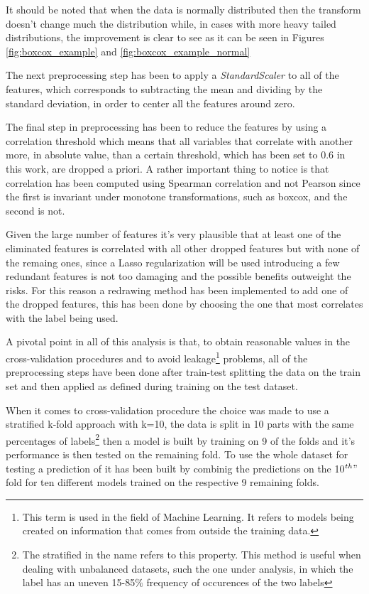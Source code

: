 It should be noted that when the data is normally distributed then the transform doesn't change much the distribution while, in cases with more heavy tailed distributions, the improvement is clear to see as it can be seen in Figures \ref{fig:boxcox_example} and \ref{fig:boxcox_example_normal}

The next preprocessing step has been to apply a \textit{StandardScaler} to all of the features, which corresponds to subtracting the mean and dividing by the standard deviation, in order to center all the features around zero. 

The final step in preprocessing has been to reduce the features by using a correlation threshold which means that all variables that correlate with another more, in absolute value, than a certain threshold, which has been set to 0.6 in this work, are dropped a priori. A rather important thing to notice is that correlation has been computed using Spearman correlation and not Pearson since the first is invariant under monotone transformations, such as boxcox, and the second is not.

Given the large number of features it's very plausible that at least one of the eliminated features is correlated with all other dropped features but with none of the remaing ones, since a Lasso regularization will be used introducing a few redundant features is not too damaging and the possible benefits outweight the risks. For this reason a redrawing method has been implemented to add one of the dropped features, this has been done by choosing the one that most correlates with the label being used.

A pivotal point in all of this analysis is that, to obtain reasonable values in the cross-validation procedures and to avoid leakage\footnote{This term is used in the field of Machine Learning. It refers to models being created on information that comes from outside the training data.} problems, all of the preprocessing steps have been done after train-test splitting the data on the train set and then applied as defined during training on the test dataset.

When it comes to cross-validation procedure the choice was made to use a stratified k-fold approach with k=10, the data is split in 10 parts with the same percentages of labels\footnote{The stratified in the name refers to this property. This method is useful when dealing with unbalanced datasets, such the one under analysis, in which the label has an uneven 15-85$\%$ frequency of occurences of the two labels} then a model is built by training on 9 of the folds and it's performance is then tested on the remaining fold. To use the whole dataset for testing a prediction of it has been built by combinig the predictions on the 10$^{th}"$ fold for ten different models trained on the respective 9 remaining folds.

